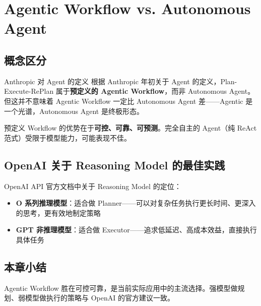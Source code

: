 \section{Agentic Workflow vs. Autonomous Agent}

\subsection{概念区分}

\begin{knowledgebox}{Anthropic 对 Agent 的定义}
根据 Anthropic 年初关于 Agent 的定义，Plan-Execute-RePlan 属于\textbf{预定义的 Agentic Workflow}，而非 Autonomous Agent。但这并不意味着 Agentic Workflow 一定比 Autonomous Agent 差——Agentic 是一个光谱，Autonomous Agent 是终极形态。
\end{knowledgebox}

预定义 Workflow 的优势在于\textbf{可控、可靠、可预测}。完全自主的 Agent（纯 ReAct 范式）受限于模型能力，可能表现不佳。

\subsection{OpenAI 关于 Reasoning Model 的最佳实践}

OpenAI API 官方文档中关于 Reasoning Model 的定位：
\begin{itemize}
    \item \textbf{O 系列推理模型}：适合做 Planner——可以对复杂任务执行更长时间、更深入的思考，更有效地制定策略
    \item \textbf{GPT 非推理模型}：适合做 Executor——追求低延迟、高成本效益，直接执行具体任务
\end{itemize}

\subsection{本章小结}

Agentic Workflow 胜在可控可靠，是当前实际应用中的主流选择。强模型做规划、弱模型做执行的策略与 OpenAI 的官方建议一致。

